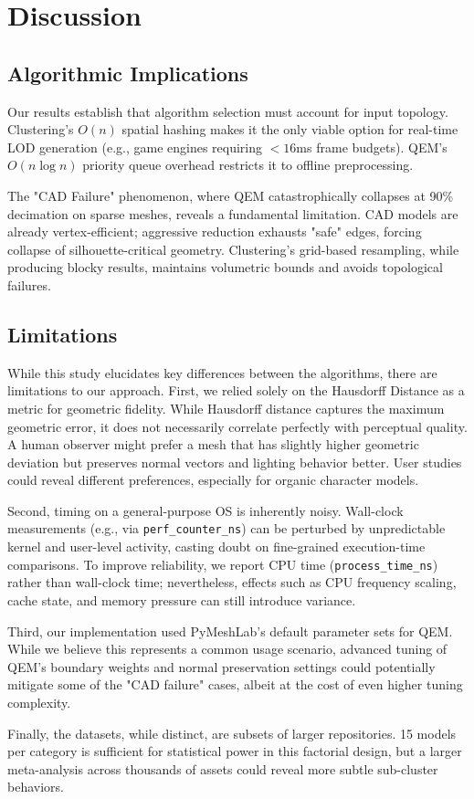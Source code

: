\section{Discussion}

\subsection{Algorithmic Implications}
Our results establish that algorithm selection must account for input topology. Clustering's $O(n)$ spatial hashing makes it the only viable option for real-time LOD generation (e.g., game engines requiring $<16$ms frame budgets). QEM's $O(n \log n)$ priority queue overhead restricts it to offline preprocessing.

The "CAD Failure" phenomenon, where QEM catastrophically collapses at 90\% decimation on sparse meshes, reveals a fundamental limitation. CAD models are already vertex-efficient; aggressive reduction exhausts "safe" edges, forcing collapse of silhouette-critical geometry. Clustering's grid-based resampling, while producing blocky results, maintains volumetric bounds and avoids topological failures.

\subsection{Limitations}
While this study elucidates key differences between the algorithms, there are limitations to our approach. First, we relied solely on the Hausdorff Distance as a metric for geometric fidelity. While Hausdorff distance captures the maximum geometric error, it does not necessarily correlate perfectly with perceptual quality. A human observer might prefer a mesh that has slightly higher geometric deviation but preserves normal vectors and lighting behavior better. User studies could reveal different preferences, especially for organic character models.

Second, timing on a general-purpose OS is inherently noisy. Wall-clock measurements (e.g., via \texttt{perf\_counter\_ns}) can be perturbed by unpredictable kernel and user-level activity, casting doubt on fine-grained execution-time comparisons. To improve reliability, we report CPU time (\texttt{process\_time\_ns}) rather than wall-clock time; nevertheless, effects such as CPU frequency scaling, cache state, and memory pressure can still introduce variance.

Third, our implementation used PyMeshLab's default parameter sets for QEM. While we believe this represents a common usage scenario, advanced tuning of QEM's boundary weights and normal preservation settings could potentially mitigate some of the "CAD failure" cases, albeit at the cost of even higher tuning complexity.

Finally, the datasets, while distinct, are subsets of larger repositories. 15 models per category is sufficient for statistical power in this factorial design, but a larger meta-analysis across thousands of assets could reveal more subtle sub-cluster behaviors.
